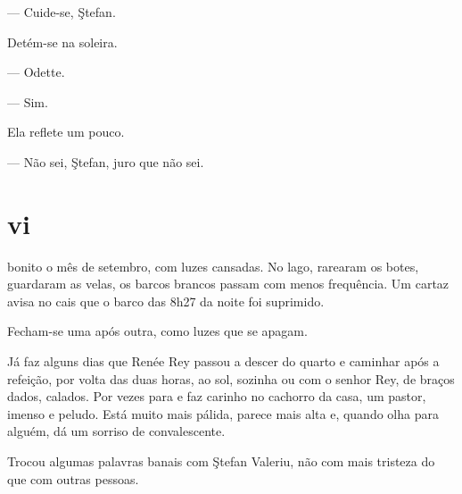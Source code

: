 

\asterisc


--- Cuide-se, Ştefan.

Detém-se na soleira.

--- Odette.

--- Sim.


Ela reflete um pouco.

--- Não sei, Ştefan, juro que não sei.

\pagebreak

\section{vi}

 bonito o mês de setembro, com luzes cansadas. No lago, rarearam
os botes, guardaram as velas, os barcos brancos passam com menos
frequência. Um cartaz avisa no cais que o barco das 8h27 da noite foi
suprimido.



Fecham-se uma após outra, como luzes que se apagam.

Já faz alguns dias que Renée Rey passou a descer do quarto e caminhar
após a refeição, por volta das duas horas, ao sol, sozinha ou com o
senhor Rey, de braços dados, calados. Por vezes para e faz carinho no
cachorro da casa, um pastor, imenso e peludo. Está muito mais pálida,
parece mais alta e, quando olha para alguém, dá um sorriso de
convalescente.

Trocou algumas palavras banais com Ştefan Valeriu, não com mais tristeza
do que com outras pessoas.

